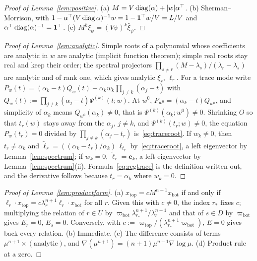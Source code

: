 \documentclass[11pt,a4paper]{report}
\newcommand{\one}{\mathbf 1}
\newcommand{\bfe}{\mathbf e}
\newcommand{\xb}{x_{\mathrm{bot}}}
\newcommand{\xt}{x_{\mathrm{top}}}
\newcommand{\piv}{\varpi}
\begin{document}
\begin{proof}[Proof of Lemma~\ref{lem:positive}]
(a) \(M=V\operatorname{diag}(\alpha)+|w|\alpha^\top\). (b) Sherman--Morrison, with \(1-\alpha^\top(V\diag\alpha)^{-1}w=1-\one^\top w/V=L/V\) and
\(\alpha^\top\diag(\alpha)^{-1}=\one^\top\). (c) \(M^k\hat\xi_\psi=(V\psi)^k\hat\xi_\psi\).
\end{proof}

\begin{proof}[Proof of Lemma~\ref{lem:analytic}]
Simple roots of a polynomial whose coefficients are analytic in \(w\) are analytic (implicit function theorem); simple real
roots stay real and keep their order; the spectral projectors \(\prod_{s\ne r}(M-\lambda_s)/(\lambda_r-\lambda_s)\) are analytic and of
rank one, which gives analytic \(\xi_r\), \(\ell_r\). For a trace mode write
\(P_w(t)=(\alpha_k-t)Q_w(t)-\alpha_kw_k\prod_{j\ne k}(\alpha_j-t)\) with \(Q_w(t):=\prod_{j\ne k}(\alpha_j-t)\Psi^{(k)}(t;w)\). At \(w^0\),
\(P_{w^0}=(\alpha_k-t)Q_{w^0}\), and simplicity of \(\alpha_k\) means \(Q_{w^0}(\alpha_k)\ne0\), that is \(\Psi^{(k)}(\alpha_k;w^0)\ne0\). Shrinking \(O\)
so that \(t_r(w)\) stays away from the \(\alpha_j\), \(j\ne k\), and \(\Psi^{(k)}(t_r;w)\ne0\), the equation \(P_w(t_r)=0\) divided by
\(\prod_{j\ne k}(\alpha_j-t_r)\) is~\eqref{eq:traceroot}. If \(w_k\ne0\), then \(t_r\ne\alpha_k\) and \(\tilde\ell_r=((\alpha_k-t_r)/\alpha_k)\,\ell_{t_r}\)
by~\eqref{eq:traceroot}, a left eigenvector by Lemma~\ref{lem:spectrum}; if \(w_k=0\), \(\tilde\ell_r=\bfe_k\), a left eigenvector by
Lemma~\ref{lem:spectrum}(ii). Formula~\eqref{eq:regtrace} is the definition written out, and the derivative follows because
\(t_r=\alpha_k\) where \(w_k=0\).
\end{proof}

\begin{proof}[Proof of Lemma~\ref{lem:productform}]
(a) \(\xt=cM^{n+1}\xb\) if and only if \(\ell_r\cdot\xt=c\lambda_r^{n+1}\ell_r\cdot\xb\) for all \(r\). Given this with \(c\ne0\), the index
\(r_*\) fixes \(c\); multiplying the relation of \(r\in U\) by \(\piv_{\mathrm{bot}}\lambda_{r_*}^{n+1}/\lambda_r^{n+1}\) and that of \(s\in D\) by
\(\piv_{\mathrm{bot}}\) gives \(E_r=0\), \(E_s=0\). Conversely, with \(c:=\piv_{\mathrm{top}}/(\lambda_{r_*}^{n+1}\piv_{\mathrm{bot}})\), \(E=0\) gives back every
relation. (b) Immediate. (c) The difference consists of terms \(\mu^{n+1}\times(\text{analytic})\), and
\(\nabla(\mu^{n+1})=(n+1)\mu^{n+1}\nabla\log\mu\). (d) Product rule at a zero.
\end{proof}
\end{document}
